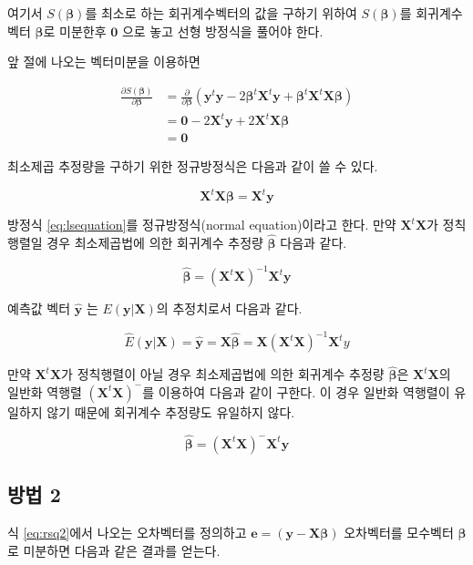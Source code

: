 \documentclass[
]{book}
\newcommand{\pardiff}[2]{\frac{\partial #1}{\partial #2 }}
\theoremstyle{definition}
\theoremstyle{definition}
\theoremstyle{definition}
\theoremstyle{remark}
\begin{document}
여기서 \(S( \bm \beta)\)를 최소로 하는 회귀계수벡터의 값을 구하기 위하여 \(S( \bm \beta)\)를 회귀계수벡터 \(\bm \beta\)로 미분한후 \(\bm 0\) 으로 놓고 선형 방정식을 풀어야 한다.

앞 절에 나오는 벡터미분을 이용하면

\begin{align*}
 \pardiff{ S( {\bm \beta})}{\bm \beta} & = 
 \pardiff{}{\bm \beta} (\bm y^t \bm y -2  \bm \beta^t \bm X^t \bm y
    + \bm \beta^t \bm X^t \bm X \bm \beta) \\
 & = \bm 0 -2 \bm X^t \bm y + 2 \bm X^t \bm X \bm \beta \\
 & =\bm 0
 \end{align*}

최소제곱 추정량을 구하기 위한 정규방정식은 다음과 같이 쓸 수 있다.

\begin{equation} 
 \bm X^t \bm X \bm \beta =  \bm X^t \bm y
 \label{eq:lsequation}
\end{equation}

방정식 \eqref{eq:lsequation}를 정규방정식(normal equation)이라고 한다. 만약 \(\bm X^t \bm X\)가 정칙행렬일 경우 최소제곱법에 의한 회귀계수 추정량 \(\hat {\bm \beta}\) 다음과 같다.

\begin{equation}
  \hat {\bm \beta} = ( \bm X^t \bm X)^{-1} \bm X^t \bm y
  \label{eq:lsestimator}
\end{equation}

예측값 벡터 \(\hat {\bm y}\) 는 \(E(\bm y | \bm X)\)의 추정치로서 다음과 같다.

\[ \hat E(\bm y | \bm X)= \hat {\bm y} = \bm X \hat {\bm \beta} = \bm  X(\bm X^t \bm X)^{-1} \bm X^t y \]

만약 \(\bm X^t \bm X\)가 정칙행렬이 아닐 경우 최소제곱법에 의한 회귀계수 추정량 \(\hat {\bm \beta}\)은 \(\bm X^t \bm X\)의 일반화 역행렬 \((\bm X^t \bm X)^-\)를 이용하여 다음과 같이 구한다. 이 경우 일반화 역행렬이 유일하지 않기 때문에 회귀계수 추정량도 유일하지 않다.

\[
  \hat {\bm \beta} = ( \bm X^t \bm X)^{-} \bm X^t \bm y
\]

\hypertarget{uxbc29uxbc95-2}{%
\subsection{방법 2}\label{uxbc29uxbc95-2}}

식 \eqref{eq:rsq2}에서 나오는 오차벡터를 정의하고 \(\bm e = (\bm y - \bm X \bm \beta)\) 오차벡터를
모수벡터 \(\bm \beta\)로 미분하면 다음과 같은 결과를 얻는다.
\end{document}
